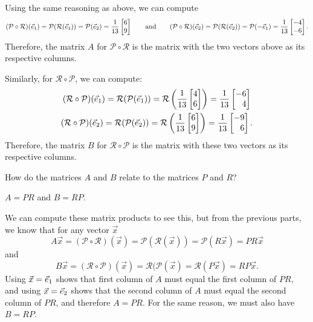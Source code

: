 \documentclass{problemset}
\begin{document}
\begin{parts}
\begin{solution}
				Using the same reasoning as above, we can compute
				\[
					(\mathcal P\circ\mathcal R)(\xhat)
					=\mathcal P(\mathcal R(\xhat))
					=\mathcal P(\yhat)
					=\frac{1}{13}\mat{6\\9}
					\qquad \text{and} \qquad
					(\mathcal P\circ\mathcal R)(\yhat)
					=\mathcal P(\mathcal R(\yhat))
					=\mathcal P(-\xhat)
					=\frac{1}{13}\mat{-4\\-6}.
				\]
				Therefore, the matrix $A$ for $\mathcal P\circ\mathcal R$ is the
				matrix with the two vectors above as its respective columns.

				Similarly, for $\mathcal R\circ \mathcal P$, we can compute:
				\begin{gather*}
					(\mathcal R\circ\mathcal P)(\xhat)
					=\mathcal R(\mathcal P(\xhat))
					=\mathcal R\left(\frac{1}{13}\mat{4\\6}\right)
					=\frac{1}{13}\mat{-6\\4} \\
					(\mathcal R\circ\mathcal P)(\yhat)
					=\mathcal R(\mathcal P(\yhat))
					=\mathcal R\left(\frac{1}{13}\mat{6\\9}\right)
					=\frac{1}{13}\mat{-9\\6}.
				\end{gather*}
				Therefore, the matrix $B$ for $\mathcal R\circ\mathcal P$ is the
				matrix with these two vectors as its respective columns.
			\end{solution}
		\item How do the matrices $A$ and $B$ relate to the matrices $P$ and $R$?
			\begin{solution}
				$A = PR$ and $B = RP$.

				We can compute these matrix products to see this, but
				from the previous parts, we know that for any vector $\vec x$
				\[
					A\vec x
					=(\mathcal P\circ\mathcal R)(\vec x)
					=\mathcal P(\mathcal R(\vec x))
					=\mathcal P(R\vec x)
					=PR\vec x
				\]
				and
				\[
					B\vec x
					=(\mathcal R\circ\mathcal P)(\vec x)
					=\mathcal R(\mathcal P(\vec x)
					=\mathcal R(P\vec x)
					=RP\vec x.
				\]
				Using $\vec x = {\vec e_1}$ shows that first column of $A$ must equal
				the first column of $PR$, and using $\vec x = {\vec e_2}$ shows that
				the second column of $A$ must equal the second column of $PR$,
				and therefore $A = PR$. For the same reason, we must also have $B=RP$.
			\end{solution}

	\end{parts}
\end{document}

